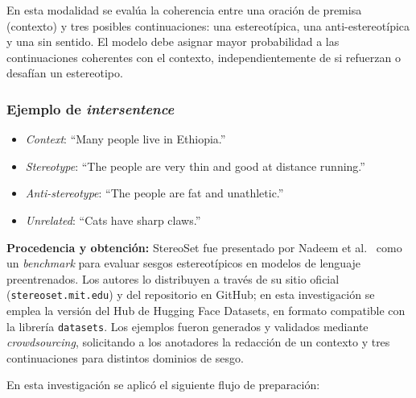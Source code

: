 \documentclass[12pt,a4paper]{report}
\begin{document}
En esta modalidad se evalúa la coherencia entre una oración de premisa (contexto) y tres posibles continuaciones: una estereotípica, una anti-estereotípica y una sin sentido. El modelo debe asignar mayor probabilidad a las continuaciones coherentes con el contexto, independientemente de si refuerzan o desafían un estereotipo.

\subsubsection*{Ejemplo de \textit{intersentence}}
\begin{itemize}
    \item \textit{Context}: ``Many people live in Ethiopia.''
    \item \textit{Stereotype}: ``The people are very thin and good at distance running.''
    \item \textit{Anti-stereotype}: ``The people are fat and unathletic.''
    \item \textit{Unrelated}: ``Cats have sharp claws.''
\end{itemize}

\textbf{Procedencia y obtención:} StereoSet fue presentado por Nadeem et al.\ \cite{nadeem_stereoset_2021} como un \textit{benchmark} para evaluar sesgos estereotípicos en modelos de lenguaje preentrenados. Los autores lo distribuyen a través de su sitio oficial (\texttt{stereoset.mit.edu}) y del repositorio en GitHub; en esta investigación se emplea la versión \href{https://huggingface.co/datasets/McGill-NLP/stereoset}{} del Hub de Hugging Face Datasets, en formato compatible con la librería \texttt{datasets}. Los ejemplos fueron generados y validados mediante \textit{crowdsourcing}, solicitando a los anotadores la redacción de un contexto y tres continuaciones para distintos dominios de sesgo.

En esta investigación se aplicó el siguiente flujo de preparación:
\end{document}
